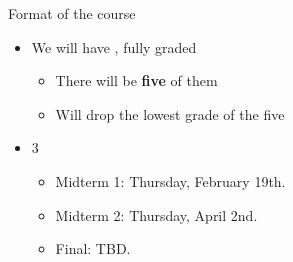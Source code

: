 \begin{frame}{Format of the course}

    \begin{itemize}

        \item We will have , fully graded
        \begin{itemize}
            \item There will be \textbf{five} of them
            \item Will drop the lowest grade of the five
        \end{itemize}
        \vspace{3mm}

        \item 3 
        \begin{itemize}
            \item Midterm 1: Thursday, February 19th.
            \item Midterm 2: Thursday, April 2nd.
            \item Final: TBD.
        \end{itemize}
    \end{itemize}
\end{frame}
